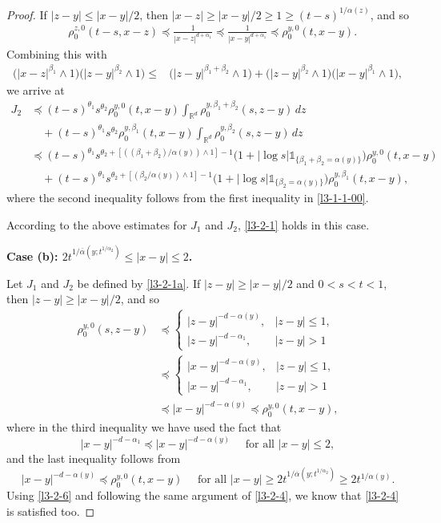 \documentclass[a4paper,11pt]{amsart}
\renewcommand{\le}{\leqslant}
\renewcommand{\ge}{\geqslant}
\newcommand{\R}{\mathds R}
\newcommand{\B}{\beta}
\newcommand{\T}{\theta}
\newcommand{\I}{\mathds 1}
\newcommand{\p}{\preceq}
\newcommand{\A}{\alpha}
\theoremstyle{definition}
\begin{document}
\begin{proof}
If $|z-y|\le {|x-y|}/{2}$, then $|x-z|\ge
{|x-y|}/{2}\ge 1 \ge (t-s)^{{1}/{\A(z)}}$, and so
\begin{align*}
& \rho_0^{z,0}(t-s,x-z)\p \frac{1}{|x-z|^{d+\A_1}}\p \frac{1}{|x-y|^{d+\A_1}}\p \rho_0^{y,0}(t,x-y).
\end{align*}
Combining this with
\begin{equation}\label{l3-2-5}
\begin{split}
\big(|x-z|^{\B_1}\wedge 1\big)
\big(|z-y|^{\B_2}\wedge 1\big)\le &\big(|z-y|^{\B_1+\B_2}\wedge 1\big) +\big(|z-y|^{\B_2}\wedge 1\big)
\big(|x-y|^{\B_1}\wedge 1\big),
\end{split}
\end{equation}
we arrive at
\begin{equation}\label{l3-2-5a}
\begin{split}
J_2&\p (t-s)^{\T_1}s^{\T_2}\rho_0^{y,0}(t,x-y)\int_{\R^d}\rho^{y,\B_1+\B_2}_0(s,z-y)\, dz\\
&\quad +(t-s)^{\T_1}s^{\T_2}\rho_0^{y,\B_1}(t,x-y)\int_{\R^d}\rho^{y,\B_2}_0(s,z-y)\, dz\\
&\p (t-s)^{\T_1}s^{\T_2+[(({\B_1+\B_2})/{\A(y)})\wedge 1]-1}
\big(1+|\log s|\I_{\{\B_1+\B_2=\A(y)\}}\big)\rho_0^{y,0}(t,x-y)\\
&\quad+
(t-s)^{\T_1}s^{\T_2+[({\B_2}/{\A(y)})\wedge 1]-1}\big(1+|\log s|\I_{\{\B_2=\A(y)\}}\big)\rho_0^{y,\B_1}(t,x-y),
\end{split}
\end{equation}
where the second inequality follows from the first inequality in \eqref{l3-1-1-00}.


According to the above estimates for $J_1$ and $J_2$, \eqref{l3-2-1} holds in this case.



{\bf Case (b): $2t^{{1}/{\overline{\A}(y;t^{{1/\A_2}})}}\le |x-y|\le 2$.}

Let $J_1$ and $J_2$ be defined by \eqref{l3-2-1a}. If $|z-y|\ge
{|x-y|}/{2}$ and $0<s<t<1$, then $|z-y|\ge {|x-y|}/{2}$,
and so
\begin{equation}\label{l3-2-6}
\begin{split}
\rho_0^{y,0}(s,z-y)&\p
\begin{cases}
|z-y|^{-d-\A(y)},& |z-y|\le 1,\\
 |z-y|^{-d-\A_1},& |z-y|>1
\end{cases}
\\
&\p \begin{cases}
|x-y|^{-d-\A(y)},&|z-y|\le 1,\\
|x-y|^{-d-\A_1},& |z-y|>1
\end{cases}
\\
&\p |x-y|^{-d-\A(y)}\p \rho^{y,0}_0(t,x-y),
\end{split}
\end{equation}
where in
the third inequality we have used the fact that
$$|x-y|^{-d-\A_1}\p |x-y|^{-d-\A(y)}\quad \textrm{ for all }|x-y|\le 2 ,$$ and the last
inequality follows from
$$|x-y|^{-d-\A(y)} \p  \rho^{y,0}_0(t,x-y)\quad\textrm{ for all } |x-y|\ge 2t^{{1}/{\overline{\A}(y;t^{{1/\A_2}})}}\ge 2t^{{1/\A(y)}}.$$
Using \eqref{l3-2-6} and following the same argument of \eqref{l3-2-4}, we know that \eqref{l3-2-4} is satisfied too.



\end{proof}
\end{document}
